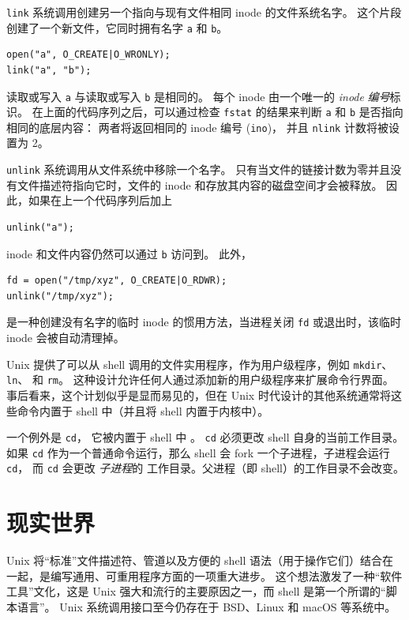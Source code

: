 \lstinline{link}
系统调用创建另一个指向与现有文件相同 inode 的文件系统名字。
这个片段创建了一个新文件，它同时拥有名字
\lstinline{a}
和
\lstinline{b}。
\begin{lstlisting}[]
open("a", O_CREATE|O_WRONLY);
link("a", "b");
\end{lstlisting}
读取或写入
\lstinline{a}
与读取或写入
\lstinline{b}
是相同的。
每个 inode 由一个唯一的
\textit{inode}
\textit{编号}标识。
在上面的代码序列之后，可以通过检查
\lstinline{fstat}
的结果来判断
\lstinline{a}
和
\lstinline{b}
是否指向相同的底层内容：
两者将返回相同的 inode 编号 
(\lstinline{ino})，
并且
\lstinline{nlink}
计数将被设置为 2。

\lstinline{unlink}
系统调用从文件系统中移除一个名字。
只有当文件的链接计数为零并且没有文件描述符指向它时，文件的 inode 和存放其内容的磁盘空间才会被释放。
因此，如果在上一个代码序列后加上
\begin{lstlisting}[]
unlink("a");
\end{lstlisting}
inode 和文件内容仍然可以通过
\lstinline{b}
访问到。
此外，
\begin{lstlisting}[]
fd = open("/tmp/xyz", O_CREATE|O_RDWR);
unlink("/tmp/xyz");
\end{lstlisting}
是一种创建没有名字的临时 inode 的惯用方法，当进程关闭
\lstinline{fd}
或退出时，该临时 inode 会被自动清理掉。

Unix 提供了可以从 shell 调用的文件实用程序，作为用户级程序，例如
\lstinline{mkdir}、
\lstinline{ln}、
和
\lstinline{rm}。
这种设计允许任何人通过添加新的用户级程序来扩展命令行界面。事后看来，这个计划似乎是显而易见的，但在 Unix 时代设计的其他系统通常将这些命令内置于 shell 中（并且将 shell 内置于内核中）。

一个例外是
\lstinline{cd}，
它被内置于 shell 中
。
\lstinline{cd}
必须更改 shell 自身的当前工作目录。如果
\lstinline{cd}
作为一个普通命令运行，那么 shell 会 fork 一个子进程，子进程会运行
\lstinline{cd}，
而
\lstinline{cd}
会更改
\textit{子进程}的
工作目录。父进程（即
shell）的工作目录不会改变。
\section{现实世界}

Unix 将“标准”文件描述符、管道以及方便的 shell 语法（用于操作它们）结合在一起，是编写通用、可重用程序方面的一项重大进步。
这个想法激发了一种“软件工具”文化，这是 Unix 强大和流行的主要原因之一，而 shell 是第一个所谓的“脚本语言”。
Unix 系统调用接口至今仍存在于 BSD、Linux 和 macOS 等系统中。

